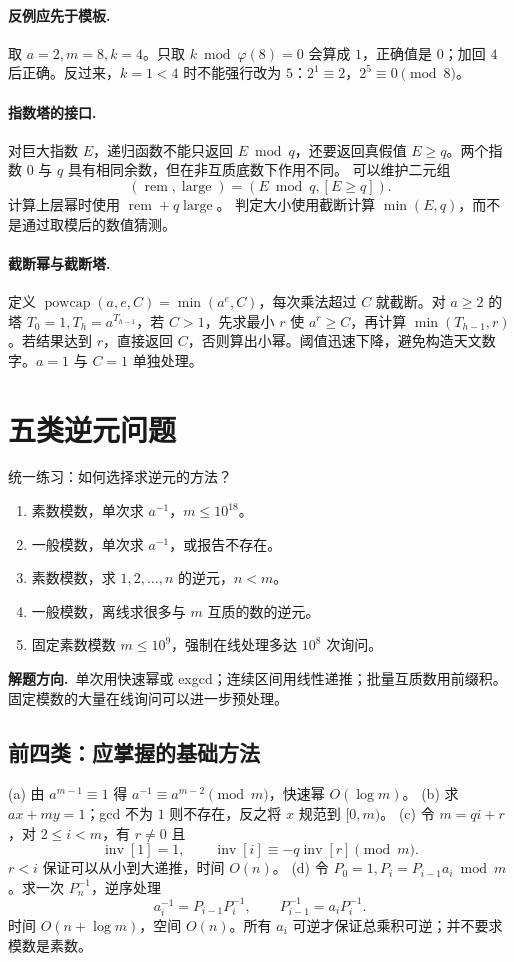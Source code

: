 \documentclass[UTF8,a4paper,11pt,oneside,openany,fontset=fandol]{ctexbook}
\theoremstyle{definition}
\newcommand{\iva}[1]{\left[#1\right]}
\newcommand{\hint}{\par\noindent\textbf{解题方向.}\ }
\begin{document}
\paragraph{反例应先于模板.} 取 $a=2,m=8,k=4$。只取 $k\bmod\varphi(8)=0$ 会算成 $1$，正确值是 $0$；加回 $4$ 后正确。反过来，$k=1<4$ 时不能强行改为 $5$：$2^1\equiv2$，$2^5\equiv0\pmod8$。

\paragraph{指数塔的接口.} 对巨大指数 $E$，递归函数不能只返回 $E\bmod q$，还要返回真假值 $E\ge q$。两个指数 $0$ 与 $q$ 具有相同余数，但在非互质底数下作用不同。
可以维护二元组
\[
 (\operatorname{rem},\operatorname{large})=(E\bmod q,\iva{E\ge q}).
\]
计算上层幂时使用 $\operatorname{rem}+q\operatorname{large}$。
判定大小使用截断计算 $\min(E,q)$，而不是通过取模后的数值猜测。

\paragraph{截断幂与截断塔.} 定义 $\operatorname{powcap}(a,e,C)=\min(a^e,C)$，每次乘法超过 $C$ 就截断。对 $a\ge2$ 的塔 $T_0=1,T_h=a^{T_{h-1}}$，若 $C>1$，先求最小 $r$ 使 $a^r\ge C$，再计算 $\min(T_{h-1},r)$。若结果达到 $r$，直接返回 $C$，否则算出小幂。阈值迅速下降，避免构造天文数字。$a=1$ 与 $C=1$ 单独处理。


\section{五类逆元问题}
\begin{problem}{统一练习：如何选择求逆元的方法？}
\begin{enumerate}[label=(\alph*)]
\item 素数模数，单次求 $a^{-1}$，$m\le10^{18}$。
\item 一般模数，单次求 $a^{-1}$，或报告不存在。
\item 素数模数，求 $1,2,\ldots,n$ 的逆元，$n<m$。
\item 一般模数，离线求很多与 $m$ 互质的数的逆元。
\item 固定素数模数 $m\le10^9$，强制在线处理多达 $10^8$ 次询问。
\end{enumerate}
\end{problem}
\hint 单次用快速幂或 exgcd；连续区间用线性递推；批量互质数用前缀积。固定模数的大量在线询问可以进一步预处理。


\subsection{前四类：应掌握的基础方法}
(a) 由 $a^{m-1}\equiv1$ 得 $a^{-1}\equiv a^{m-2}\pmod m$，快速幂 $O(\log m)$。
(b) 求 $ax+my=1$；gcd 不为 $1$ 则不存在，反之将 $x$ 规范到 $[0,m)$。
(c) 令 $m=qi+r$，对 $2\le i<m$，有 $r\ne0$ 且
\[
 \operatorname{inv}[1]=1,\qquad
 \operatorname{inv}[i]\equiv-q\operatorname{inv}[r]\pmod m.
\]
$r<i$ 保证可以从小到大递推，时间 $O(n)$。
(d) 令 $P_0=1,P_i=P_{i-1}a_i\bmod m$。求一次 $P_n^{-1}$，逆序处理
\[
 a_i^{-1}=P_{i-1}P_i^{-1},\qquad P_{i-1}^{-1}=a_iP_i^{-1}.
\]
时间 $O(n+\log m)$，空间 $O(n)$。所有 $a_i$ 可逆才保证总乘积可逆；并不要求模数是素数。
\end{document}
